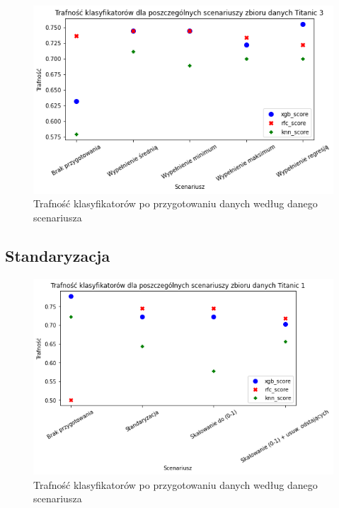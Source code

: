 \documentclass{book}
\begin{document}
\begin{figure}[H]
\centerline{\includegraphics[scale=0.5]{Titanic_3_Wypełnienie_brakujących}}
\centering
\caption{Trafność klasyfikatorów po przygotowaniu danych 
według danego scenariusza}
\end{figure}

\subsection{Standaryzacja}

\begin{figure}[H]
\centerline{\includegraphics[scale=0.5]{Titanic_1_Standaryzacja}}
\centering
\caption{Trafność klasyfikatorów po przygotowaniu danych 
według danego scenariusza}
\end{figure}
\end{document}

